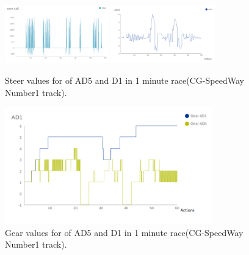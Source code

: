 \documentclass{llncs}
\begin{document}
\begin{figure}[h!]
	
	\centering
	\includegraphics[width=0.4\textwidth]{fig/AD5steer.png}
	\includegraphics[width=0.4\textwidth]{fig/AD1steer.png}
	\begin{minipage}{10cm}
		\centering
		\caption{\footnotesize Steer values for of AD5 and D1 in 1 minute race(CG-SpeedWay Number1 track).}
		\label{steer5min}
	\end{minipage} 
	
\end{figure}

\begin{figure}[h!]
	
	\centering
	\includegraphics[width=0.8\textwidth]{fig/AD1gear.png}
	
	\begin{minipage}{10cm}
		\centering
		\caption{\footnotesize Gear values for of AD5 and D1 in 1 minute race(CG-SpeedWay Number1 track). }
		\label{gear1min}
	\end{minipage} 
	
\end{figure}
\end{document}
